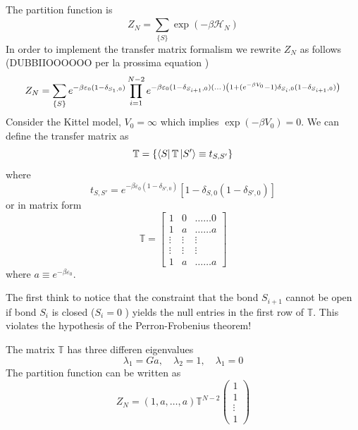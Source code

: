 \documentclass[../main/main.tex]{subfiles}
\begin{document}
The partition function is
\begin{equation}
  Z_N = \sum_{\{ S \}  }^{} \exp (-\beta \mathcal{H}_N)
\end{equation}
In order to implement the transfer matrix formalism we rewrite \( Z_N \) as follows (DUBBIIOOOOOO per la prossima equation )
\begin{equation}
  Z_N = \sum_{\{ S \}  }^{} e^{-\beta \varepsilon _0 (1- \delta _{S_1,0})}  \prod_{i=1}^{N-2} e^{-\beta \varepsilon _0 (1- \delta _{S_{i+1},0}) \qty(\dots) \qty(1 + (e^{-\beta V_0}-1 ) \delta _{S_i,0}(1- \delta _{S_{i+1},0}))  }
\end{equation}
Consider the Kittel model, \( V_0 = \infty  \) which implies \( \exp (-\beta V_0) = 0  \). We can define the transfer matrix as
\begin{equation}
  \mathbb{T} = \{ \bra{S} \mathbb{T} \ket{S'} \equiv t_{S,S'}   \}
\end{equation}
where
\begin{equation}
t_{S,S'} = e^{-\beta \varepsilon _0 (1- \delta _{S',0})} [1 - \delta _{S,0} (1- \delta _{S',0})]
\end{equation}
or in matrix form
\begin{equation}
  \mathbb{T} =
  \begin{bmatrix}
    1 & 0 & \dots \dots 0 \\
    1 & a & \dots \dots a \\
    \vdots & \vdots   & \vdots \\
        \vdots & \vdots &  \vdots \\
        1 & a & \dots \dots  a
  \end{bmatrix}
\end{equation}
where \( a \equiv e^{-\beta \varepsilon _0}  \).

The first think to notice that the constraint that the bond \( S_{i+1} \) cannot be open if bond \( S_i \) is closed (\( S_i =0 \) ) yields the null entries in the first row of \( \mathbb{T} \). This violates the hypothesis of the Perron-Frobenius theorem!

The matrix \( \mathbb{T} \) has three differen eigenvalues
\begin{equation}
  \lambda _1 = Ga, \quad \lambda _2 =1, \quad \lambda _1 = 0
\end{equation}
The partition function can be written as
\begin{equation}
  Z_N = (1,a, \dots,a) \mathbb{T}^{N-2} \begin{pmatrix}
  1 \\
  1 \\
  \vdots \\
  1
  \end{pmatrix}
\end{equation}
\end{document}
